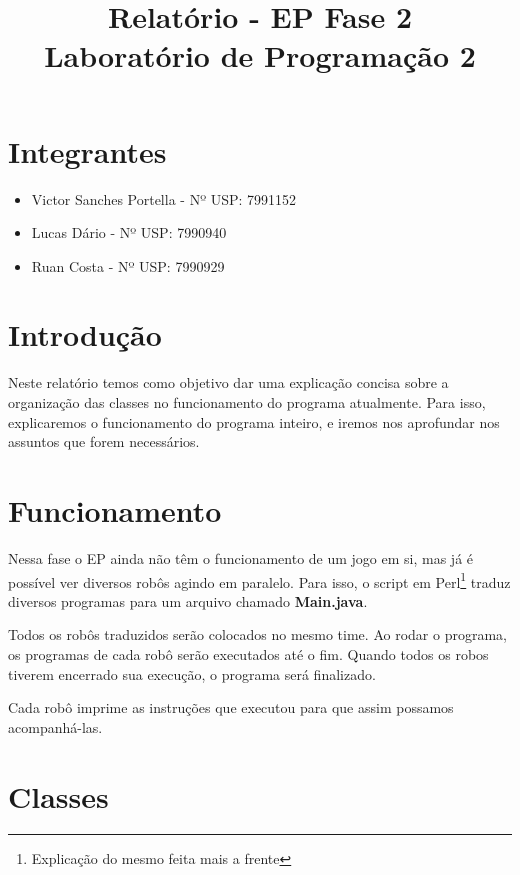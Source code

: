 \documentclass[11pt]{article}
\title{Relatório - EP Fase 2 \\ Laboratório de Programação 2}
\begin{document}
\maketitle

\section{Integrantes}

\begin{itemize}

\item Victor Sanches Portella - Nº USP: 7991152

\item Lucas Dário - Nº USP: 7990940

\item Ruan Costa - Nº USP: 7990929

\end{itemize}

\section{Introdução}

Neste relatório temos como objetivo dar uma explicação concisa sobre a organização das classes no funcionamento do programa atualmente. Para isso, explicaremos o funcionamento do programa inteiro, e iremos nos aprofundar nos assuntos que forem necessários.


\section{Funcionamento}

Nessa fase o EP ainda não têm o funcionamento de um jogo em si, mas já é possível ver diversos robôs agindo em paralelo. Para isso, o script em Perl\footnote{Explicação do mesmo feita mais a frente} traduz diversos programas para um arquivo chamado \textbf{\color{red}Main.java}. 

Todos os robôs traduzidos serão colocados no mesmo time. Ao rodar o programa, os programas de cada robô serão executados até o fim. Quando todos os robos tiverem encerrado sua execução, o programa será finalizado.

Cada robô imprime as instruções que executou para que assim possamos acompanhá-las.

\section{Classes}
\end{document}
